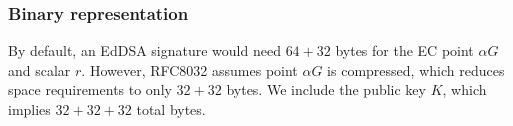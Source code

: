 \subsubsection{Binary representation}

By default, an EdDSA signature would need \(64 + 32\) bytes for the EC point $\alpha G$ and scalar $r$. However, RFC8032 assumes point \(\alpha G\) is compressed, which reduces space requirements to only \(32 + 32\) bytes. We include the public key $K$, which implies \(32 + 32 + 32\) total bytes.